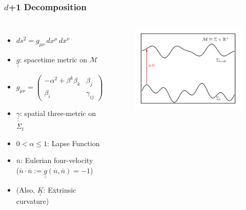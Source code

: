 \documentclass{beamer}
\newcommand{\ul}{\underline}
\newcommand{\ol}{\overline}
\begin{document}
\begin{frame}
\frametitle{$d$+1 Decomposition}

  \begin{columns}[c]


      \begin{itemize}[<+->]
        \item[]
          $ds^{2}=g_{\mu\nu}\,dx^{\mu}\,dx^{\nu}$\\[1em]
        \item[]
          $\ul{\ul{g}}$: spacetime metric on $\mathcal{M}$\\[1em]
        \item[]
          $g_{\mu\nu}
            =\begin{pmatrix}
             -\alpha^{2}+\beta^{k}\beta_{k} & \beta_{j} \\[1em]
             \beta_{i}   & \gamma_{ij}
             \end{pmatrix}$\\[1em]
        \item[]
          $\ul{\ul{\gamma}}$: spatial three-metric on $\Sigma_{t}$\\[1em]
        \item[]
          $0<\alpha\leq1$: Lapse Function\\[1em]
        \item[]
          $\ol{n}$: Eulerian four-velocity\\[1em]
          ($\ol{n}\cdot\ol{n}:=\ul{\ul{g}}\left(\ol{n},\ol{n}\right)=-1$)\\[1em]
        \item[]
          (Also, $\ul{\ul{K}}$: Extrinsic curvature)
      \end{itemize}


      \begin{figure}[htb!]
        \centering
        \includegraphics[width=\textwidth]{fig.1+1a.png}
      \end{figure}

  \end{columns}

\end{frame}
\end{document}
